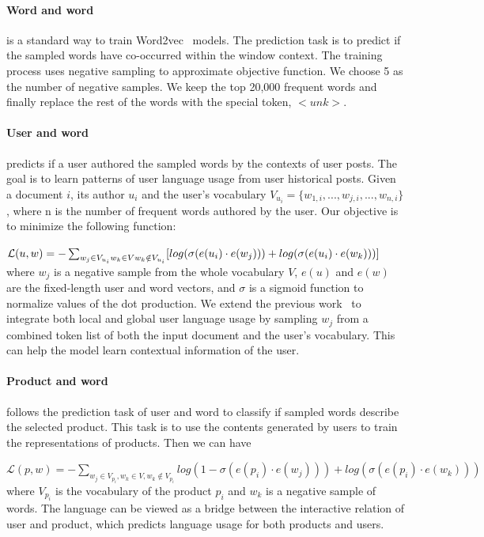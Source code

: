 \paragraph{Word and word}
is a standard way to train Word2vec~\cite{mikolov2013distributed} models. The prediction task is to predict if the sampled words have co-occurred within the window context. The training process uses negative sampling to approximate objective function. We choose 5 as the number of negative samples. We keep the top 20,000 frequent words and finally replace the rest of the words with the special token, $<unk>$. 


\paragraph{User and word}
predicts if a user authored the sampled words by the contexts of user posts. The goal is to learn patterns of user language usage from user historical posts. Given a document $i$, its author $u_i$ and the user's vocabulary $V_{u_i} = \{w_{1, i}, ..., w_{j, i}, ..., w_{n, i}\}$, where n is the number of frequent words authored by the user. Our objective is to minimize the following function:

$\mathcal{L}(u, w) = -\sum_{w_j \in V_{u_i} \\ w_k \in V \\ w_k \notin V_{u_i}}[log(\sigma(e(u_i) \cdot e(w_j))) +  log(\sigma(e(u_i) \cdot e(w_k)))]$
where $w_j$ is a negative sample from the whole vocabulary $V$, $e(u)$ and $e(w)$ are the fixed-length user and word vectors, and $\sigma$ is a sigmoid function to normalize values of the dot production. We extend the previous work~\cite{amir2017quantifying} to integrate both local and global user language usage by sampling $w_j$ from a combined token list of both the input document and the user's vocabulary.
This can help the model learn contextual information of the user.


\paragraph{Product and word}
follows the prediction task of user and word to classify if sampled words describe the selected product. This task is to use the contents generated by users to train the representations of products. Then we can have 

$\mathcal{L}(p, w) = -\sum_{w_j \in V_{p_i}, w_k \in V, w_k \notin V_{p_i}}log(1 - \sigma(e(p_i) \cdot e(w_j))) + log(\sigma(e(p_i) \cdot e(w_k)))$
where $V_{p_i}$ is the vocabulary of the product $p_i$ and $w_k$ is a negative sample of words.
The language can be viewed as a bridge between the interactive relation of user and product, which predicts language usage for both products and users.


